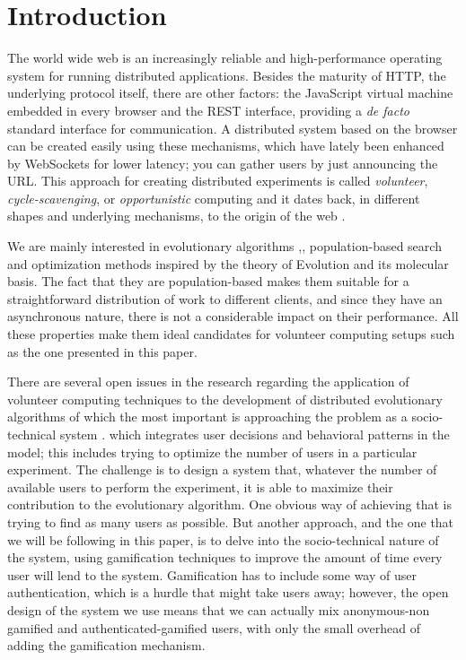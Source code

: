 \documentclass{llncs}
\begin{document}
\section{Introduction}

The world wide web is an increasingly reliable and high-performance
operating system for running distributed applications. Besides the
maturity of HTTP, the underlying protocol itself, there are other
factors: the JavaScript virtual machine embedded in every browser
and the REST interface, providing a {\em de facto} standard interface for
communication. A distributed system based on the browser can be
created easily using these mechanisms, which have lately been enhanced
by WebSockets for lower latency; you can gather users by just
announcing the URL. This approach for creating distributed experiments is called {\em
  volunteer}, {\em cycle-scavenging}, or {\em opportunistic} computing
\cite{sarmenta2001volunteer} and it dates back, in different shapes
and underlying mechanisms, to the origin of the web
\cite{david-seti:home}.

We are mainly interested in evolutionary algorithms \cite{jj-ppsn98},, population-based search and optimization methods inspired by
the theory of Evolution and its molecular basis. The fact that they are population-based makes them suitable for a straightforward distribution of work to different clients, and since they have an asynchronous nature, there is not a considerable impact on their performance. All these properties make them ideal candidates for volunteer computing setups such as the one presented in this paper.

There are several open issues in the research regarding the
application of volunteer computing techniques to the development of
distributed evolutionary algorithms of which the most important is
approaching the problem as a socio-technical system
\cite{vespignani2009predicting,merelo2015designing}. which integrates
user decisions and behavioral patterns in the model; this
includes trying to optimize the number of users in a particular
experiment. The challenge is to design a system that, whatever the
number of available users to perform the experiment, it is able to
maximize their contribution to the evolutionary algorithm. One obvious
way of achieving that is trying to find as many users as possible. But
another approach, and the one that we will be following in this paper, is
to delve into the socio-technical nature of the system, using
gamification techniques to improve the amount of time every user will
lend to the system. Gamification has to include some way of user authentication,
which is a hurdle that might take users away; however, the open design
of the system we use means that we can actually mix anonymous-non
gamified and authenticated-gamified users, with only the small overhead
of adding the gamification mechanism.
\end{document}
